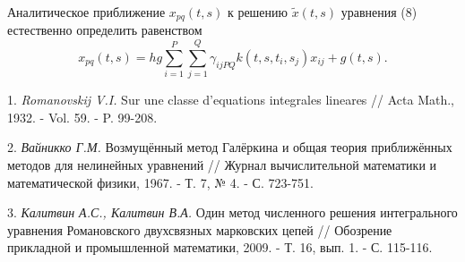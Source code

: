 
Аналитическое приближение $x_{pq}(t,s)$ к решению $\tilde x(t,s)$ уравнения (8) естественно определить равенством
$$
x_{pq}(t,s)=hg\sum\limits_{i=1}^P\sum\limits_{j=1}^Q\gamma_{ijPQ}k(t,s,t_i,s_j)x_{ij}+g(t,s).
$$

\litlist

1. {\it Romanovskij V.I.} Sur une classe d'equations integrales lineares // Acta Math., 1932. - Vol. 59. - P. 99-208.

2. {\it Вайникко Г.М.} Возмущённый метод Галёркина и общая теория приближённых методов для нелинейных уравнений
//
Журнал вычислительной математики и математической физики, 1967. - Т. 7, № 4. - С. 723-751.

3. {\it Калитвин А.С., Калитвин В.А.}
Один метод численного решения интегрального уравнения Романовского двухсвязных марковских цепей
// Обозрение прикладной и промышленной математики, 2009. - Т. 16, вып. 1. - С. 115-116.
